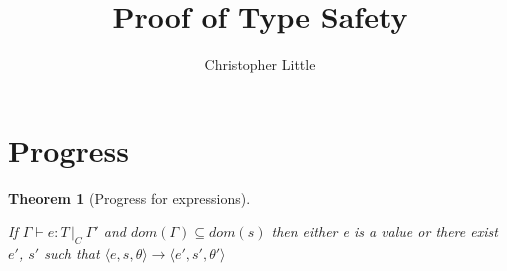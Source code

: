 \documentclass[a4paper]{article}
\theoremstyle{dotless}
\newtheorem{theorem}{Theorem}[section]
\begin{document}
\title{Proof of Type Safety}
\author{Christopher Little}
\maketitle

\section{Progress}
\newcommand{\typable}[2][ ]{\Gamma{}\vdash#2\, |C#1\:\Gamma#1'}
\newcommand{\typed}[2]{\Gamma{}\vdash#1: #2\,|_C\:\Gamma'}
\newcommand{\transition}[6]{\langle{}#1,#2,#3\rangle{}\rightarrow{}\langle{}#4,#5,#6\rangle}
\newcommand{\indHyp}{\Phi(\Gamma, m, C, \Gamma')}
\newcommand{\indHypTwo}{\Psi(\Gamma, e, T, C, \Gamma')}
\newcommand{\var}{\textbf{var}}
\newcommand{\sub}[1]{\textsubscript{#1}}

\begin{theorem}[Progress for expressions]\label{expProgress}

  If $\typed{e}{T}$ and $dom(\Gamma) \subseteq dom(s)$ then either e is a
  value or there exist $e'$, $s'$ such that $\transition{e}{s}{\theta}{e'}{s'}{\theta'}$

\end{theorem}
\end{document}
